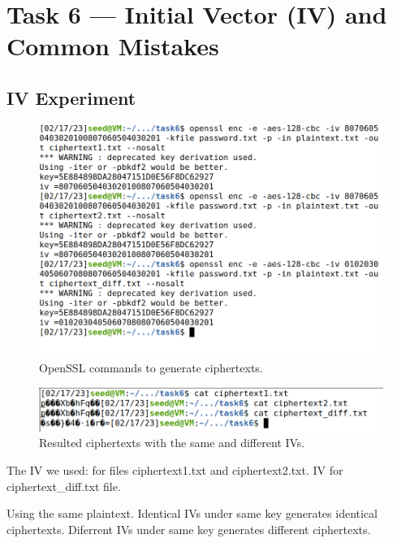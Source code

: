 \section{Task 6 --- Initial Vector (IV) and Common Mistakes}
%
\subsection{IV Experiment}
%

\begin{figure}
    \centering
    \includegraphics[height=\textheight,width=\textwidth,keepaspectratio]
    {figures/generate_cipher_dif_IV.png}
    \caption{OpenSSL commands to generate ciphertexts.}\label{fig:diff_IV_script}
\end{figure}

\begin{figure}
    \centering
    \includegraphics[height=\textheight,width=\textwidth,keepaspectratio]
    {figures/result_diff_IV.png}
    \caption{Resulted ciphertexts with the same and different IVs.}\label{fig:ciphertext_IV}
\end{figure}

The IV we used: {} for files
{\selectfont ciphertext1.txt and ciphertext2.txt}.
IV {} for
{\selectfont ciphertext\_diff.txt} file.

Using the same plaintext.
Identical IVs under same key generates identical ciphertexts.
Diferrent IVs under same key generates different ciphertexts.

